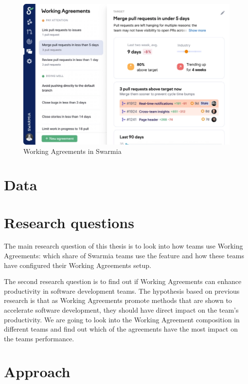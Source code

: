 \begin{figure}[ht]
    \begin{center}
        \includegraphics[width=13.5cm]{LaTeX/images/improvement.png}
        \caption{Working Agreements in Swarmia}
        \label{fig:WorkingAgreements}
    \end{center}
\end{figure}

\section{Data}


\section{Research questions}

The main research question of this thesis is to look into how teams use Working Agreements: which share of Swarmia teams use the feature and how these teams have configured their Working Agreements setup. 

The second research question is to find out if Working Agreements can enhance productivity in software development teams. The hypothesis based on previous research is that as Working Agreements promote methods that are shown to accelerate software development, they should have direct impact on the team's productivity. We are going to look into the Working Agreement composition in different teams and find out which of the agreements have the most impact on the teams performance. 

\section{Approach}

